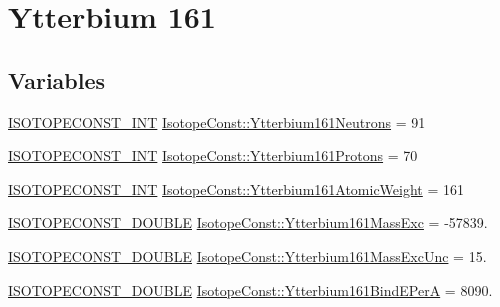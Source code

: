 \hypertarget{group___isotope_const-_ytterbium-_yb161}{}\section{Ytterbium 161}
\label{group___isotope_const-_ytterbium-_yb161}
\subsection*{Variables}
\begin{DoxyCompactItemize}
\item 
\mbox{\hyperlink{group___isotope_const-_macros_ga5f18360b3e99483a35c32d789e62621c}{I\+S\+O\+T\+O\+P\+E\+C\+O\+N\+S\+T\+\_\+\+I\+NT}} \mbox{\hyperlink{group___isotope_const-_ytterbium-_yb161_gae3ad949c267926447c1a77df7d1094d1}{Isotope\+Const\+::\+Ytterbium161\+Neutrons}} = 91
\item 
\mbox{\hyperlink{group___isotope_const-_macros_ga5f18360b3e99483a35c32d789e62621c}{I\+S\+O\+T\+O\+P\+E\+C\+O\+N\+S\+T\+\_\+\+I\+NT}} \mbox{\hyperlink{group___isotope_const-_ytterbium-_yb161_ga910b95015be71b78df84692694c9d897}{Isotope\+Const\+::\+Ytterbium161\+Protons}} = 70
\item 
\mbox{\hyperlink{group___isotope_const-_macros_ga5f18360b3e99483a35c32d789e62621c}{I\+S\+O\+T\+O\+P\+E\+C\+O\+N\+S\+T\+\_\+\+I\+NT}} \mbox{\hyperlink{group___isotope_const-_ytterbium-_yb161_ga65c443a1c93be452001512140ecb680c}{Isotope\+Const\+::\+Ytterbium161\+Atomic\+Weight}} = 161
\item 
\mbox{\hyperlink{group___isotope_const-_macros_ga8f45a7272ce02c0b4c65c44636ed719a}{I\+S\+O\+T\+O\+P\+E\+C\+O\+N\+S\+T\+\_\+\+D\+O\+U\+B\+LE}} \mbox{\hyperlink{group___isotope_const-_ytterbium-_yb161_gaa54bfe20358f9752c9a9e43afd0193d8}{Isotope\+Const\+::\+Ytterbium161\+Mass\+Exc}} = -\/57839.
\item 
\mbox{\hyperlink{group___isotope_const-_macros_ga8f45a7272ce02c0b4c65c44636ed719a}{I\+S\+O\+T\+O\+P\+E\+C\+O\+N\+S\+T\+\_\+\+D\+O\+U\+B\+LE}} \mbox{\hyperlink{group___isotope_const-_ytterbium-_yb161_ga71b89ea7945b68300d855b034d17dc0b}{Isotope\+Const\+::\+Ytterbium161\+Mass\+Exc\+Unc}} = 15.
\item 
\mbox{\hyperlink{group___isotope_const-_macros_ga8f45a7272ce02c0b4c65c44636ed719a}{I\+S\+O\+T\+O\+P\+E\+C\+O\+N\+S\+T\+\_\+\+D\+O\+U\+B\+LE}} \mbox{\hyperlink{group___isotope_const-_ytterbium-_yb161_ga75974a92e61a79e6ebe82666055e9e82}{Isotope\+Const\+::\+Ytterbium161\+Bind\+E\+PerA}} = 8090.
\item 

\end{DoxyCompactItemize}
